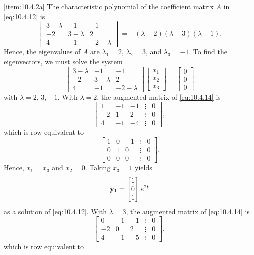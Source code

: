 \documentclass{ximera}
\begin{document}
\begin{example}
\begin{explanation}   
\ref{item:10.4.2a} The characteristic
polynomial of the  coefficient matrix $A$ in  \eqref{eq:10.4.12} is
$$
\begin{vmatrix}3-\lambda&-1&-1\\-2&3-\lambda&
2\\4
&-1&-2-\lambda\end{vmatrix}=-(\lambda-2)(\lambda-3)(\lambda+1).
$$
Hence, the eigenvalues of $A$ are $\lambda_1=2$, $\lambda_2=3$,  and
$\lambda_3=-1$.
To find the  eigenvectors, we must solve the system
\begin{equation}\label{eq:10.4.14}
\begin{bmatrix}3-\lambda&-1&-1\\-2&3-\lambda&
2\\4&-1&
-2-\lambda\end{bmatrix}\begin{bmatrix} x_1\\x_2\\x_3
\end{bmatrix}=\begin{bmatrix}0\\0\\0\end{bmatrix}
\end{equation}
with $\lambda=2$, $3$, $-1$.  With $\lambda=2$, the augmented matrix of
\eqref{eq:10.4.14} is
$$
\begin{bmatrix} 1&-1&-1&\vdots&0\\-2&
1&2&\vdots&0\\4&-1&-4&\vdots&0
\end{bmatrix},
$$
which is row equivalent to
$$
\begin{bmatrix} 1&0&-1&\vdots&0\\0&1&0&
\vdots&0\\0&0&0&\vdots&0\end{bmatrix}.
$$
Hence,  $x_1=x_3$ and $x_2=0$.  Taking $x_3=1$ yields
$$
{\bf y}_1=\begin{bmatrix}1\\0\\1\end{bmatrix}e^{2t}
$$
as a solution of  \eqref{eq:10.4.12}.  With $\lambda=3$, the augmented
matrix of  \eqref{eq:10.4.14} is
$$
\begin{bmatrix}0&-1&-1&\vdots&0\\-2&
0& 2&\vdots&0\\4&-1&-5&\vdots&0
\end{bmatrix},
$$
which is row equivalent to

\end{explanation}
\end{example}
\end{document}
